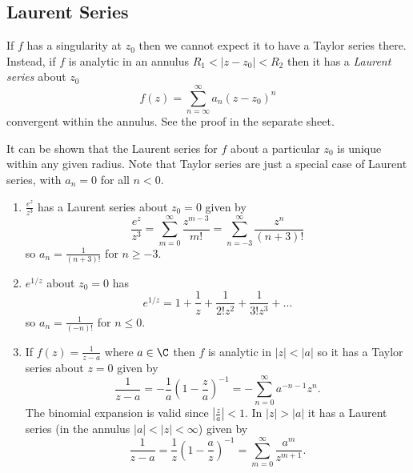 \documentclass[a4paper]{article}
\begin{document}
\subsection{Laurent Series}

If \(f\) has a singularity at \(z_0\) then we cannot expect it to have a Taylor series there. Instead, if \(f\) is analytic in an annulus \(R_1 < |z - z_0| < R_2\) then it has a \emph{Laurent series} about \(z_0\)
\[
  f(z) = \sum_{n = \infty}^\infty a_n(z - z_0)^n
\]
convergent within the annulus. See the proof in the separate sheet.

It can be shown that the Laurent series for \(f\) about a particular \(z_0\) is unique within any given radius. Note that Taylor series are just a special case of Laurent series, with \(a_n = 0\) for all \(n < 0\).

\begin{eg}\leavevmode
  \begin{enumerate}
  \item \(\frac{e^z}{z^3}\) has a Laurent series about \(z_0 = 0\) given by
    \[
      \frac{e^z}{z^3} = \sum_{m = 0}^\infty \frac{z^{m - 3}}{m!} = \sum_{n = -3}^\infty \frac{z^n}{(n + 3)!}
    \]
    so \(a_n = \frac{1}{(n + 3)!}\) for \(n \geq -3\).
  \item \(e^{1/z}\) about \(z_0 = 0\) has
    \[
      e^{1/z} = 1 + \frac{1}{z} + \frac{1}{2!z^2} + \frac{1}{3!z^3} + \dots
    \]
    so \(a_n = \frac{1}{(-n)!}\) for \(n \leq 0\).
  \item If \(f(z) = \frac{1}{z - a}\) where \(a \in \C\) then \(f\) is analytic in \(|z| < |a|\) so it has a Taylor series about \(z = 0\) given by
      \[
        \frac{1}{z - a} = -\frac{1}{a} \left( 1 - \frac{z}{a} \right)^{-1} = -\sum_{n = 0}^\infty a^{-n - 1}z^n.
      \]
      The binomial expansion is valid since \(\left| \frac{z}{a} \right| < 1\). In \(|z| > |a|\) it has a Laurent series (in the annulus \(|a| < |z| < \infty\)) given by
      \[
        \frac{1}{z - a} = \frac{1}{z} \left( 1 - \frac{a}{z} \right)^{-1} = \sum_{m = 0}^\infty \frac{a^m}{z^{m + 1}}.
      \]
  \end{enumerate}
\end{eg}
\end{document}
